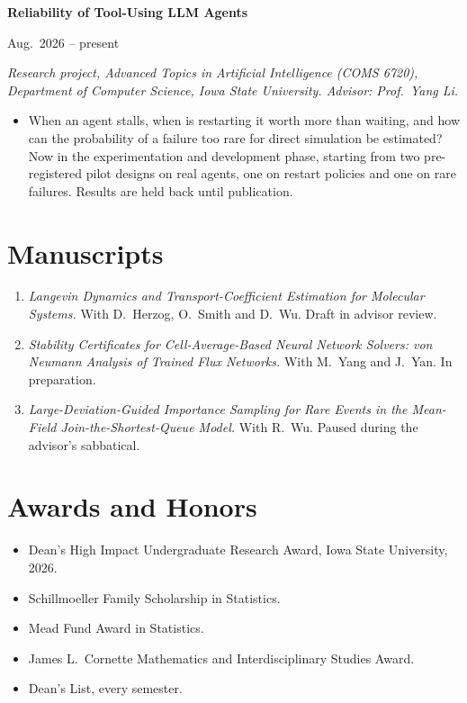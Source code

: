 \documentclass[11pt]{article}
\newcommand{\entry}[2]{%
  \noindent\begin{minipage}[t]{0.78\textwidth}\raggedright\textbf{#1}\end{minipage}%
  \hfill%
  \begin{minipage}[t]{0.22\textwidth}\raggedleft #2\end{minipage}\par\vspace{0.1em}}
\newcommand{\subentry}[1]{\noindent\textit{#1}\par\vspace{0.15em}}
\begin{document}
\vspace{0.35em}
\entry{Reliability of Tool-Using LLM Agents}{Aug.\ 2026 -- present}
\subentry{Research project, Advanced Topics in Artificial Intelligence
(COMS 6720), Department of Computer Science, Iowa State University.
Advisor: Prof.\ Yang Li.}
\begin{itemize}
  \item When an agent stalls, when is restarting it worth more than waiting, and how can
    the probability of a failure too rare for direct simulation be estimated? Now in the
    experimentation and development phase, starting from two pre-registered pilot designs
    on real agents, one on restart policies and one on rare failures. Results are held
    back until publication.
\end{itemize}

\section{Manuscripts}

\begin{enumerate}[leftmargin=1.4em,itemsep=0.4em,topsep=0.3em]
  \item \textit{Langevin Dynamics and Transport-Coefficient Estimation for Molecular
    Systems.} With D.\ Herzog, O.\ Smith and D.\ Wu. Draft in advisor review.

  \item \textit{Stability Certificates for Cell-Average-Based Neural Network Solvers:
    von Neumann Analysis of Trained Flux Networks.} With M.\ Yang and J.\ Yan.
    In preparation.

  \item \textit{Large-Deviation-Guided Importance Sampling for Rare Events in the
    Mean-Field Join-the-Shortest-Queue Model.} With R.\ Wu. Paused during the
    advisor's sabbatical.
\end{enumerate}

\section{Awards and Honors}

\begin{itemize}
  \item Dean's High Impact Undergraduate Research Award, Iowa State University, 2026.
  \item Schillmoeller Family Scholarship in Statistics.
  \item Mead Fund Award in Statistics.
  \item James L.\ Cornette Mathematics and Interdisciplinary Studies Award.
  \item Dean's List, every semester.
\end{itemize}
\end{document}
